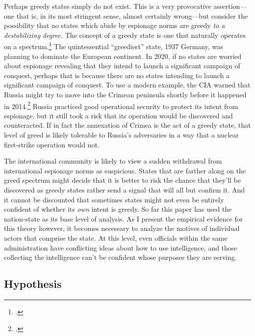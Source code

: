\documentclass[14pt]{extarticle}
\begin{document}
Perhaps greedy states simply do not exist. This is a very provocative assertion---one that is, in its most stringent sense, almost certainly wrong---but consider the possibility that no states which abide by espionage norms are greedy \emph{to a destabilizing degree.} The concept of a greedy state is one that naturally operates on a spectrum.\footcite[p.~39. Throughout his book, Glaser simplifies and complicates his theory as is necessary for the particular analysis he is performing. Greedy states can be understood as the opposite of security-seeking states, or it can be its own independant variable, allowing for the possibility of states that are greedy \emph{and} security-seeking, or just one of the two.]{glaser_rational_2010} The quintessential \enquote{greediest} state, 1937 Germany, was planning to dominate the European continent. In 2020, if no states are worried about espionage revealing that they intend to launch a significant campaign of conquest, perhaps that is because there are no states intending to launch a significant campaign of conquest. To use a modern example, the CIA warned that Russia might try to move into the Crimean peninsula shortly before it happened in 2014.\footcite{hosenball_ukraine_2014} Russia practiced good operational security to protect its intent from espionage, but it still took a risk that its operation would be discovered and counteracted. If in fact the annexation of Crimea is the act of a greedy state, that level of greed is likely tolerable to Russia's adversaries in a way that a nuclear first-strike operation would not.

The international community is likely to view a sudden withdrawal from international espionage norms as suspicious. States that are farther along on the greed spectrum might decide that it is better to risk the chance that they'll be discovered as greedy states rather send a signal that will all but confirm it. And it cannot be discounted that sometimes states might not even be entirely confident of whether its \emph{own} intent is greedy. So far this paper has used the nation-state as its base level of analysis. As I present the empirical evidence for this theory however, it becomes necessary to analyze the motives of individual actors that comprise the state. At this level, even officials within the same administration have conflicting ideas about how to use intelligence, and those collecting the intelligence can't be confident whose purposes they are serving.

\subsection{Hypothesis}
\end{document}
